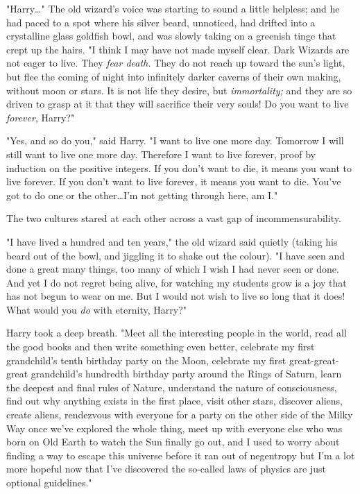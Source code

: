"Harry…" The old wizard’s voice was starting to sound a little helpless;
and he had paced to a spot where his silver beard, unnoticed, had drifted into
a crystalline glass goldfish bowl, and was slowly taking on a greenish tinge
that crept up the hairs. "I think I may have not made myself clear. Dark
Wizards are not eager to live. They \emph{fear death.} They do not reach up
toward the sun’s light, but flee the coming of night into infinitely darker
caverns of their own making, without moon or stars. It is not life they desire,
but \emph{immortality;} and they are so driven to grasp at it that they will
sacrifice their very souls! Do you want to live \emph{forever}, Harry?"

"Yes, and so do you," said Harry. "I want to live one more day. Tomorrow I will
still want to live one more day. Therefore I want to live forever, proof by
induction on the positive integers. If you don’t want to die, it means you want
to live forever. If you don’t want to live forever, it means you want to die.
You’ve got to do one or the other…I’m not getting through here, am I."

The two cultures stared at each other across a vast gap of incommensurability.

"I have lived a hundred and ten years," the old wizard said quietly (taking his
beard out of the bowl, and jiggling it to shake out the colour). "I have seen
and done a great many things, too many of which I wish I had never seen or
done. And yet I do not regret being alive, for watching my students grow is a
joy that has not begun to wear on me. But I would not wish to live so long that
it does! What would you \emph{do} with eternity, Harry?"

Harry took a deep breath. "Meet all the interesting people in the world, read
all the good books and then write something even better, celebrate my first
grandchild’s tenth birthday party on the Moon, celebrate my first
great-great-great grandchild’s hundredth birthday party around the Rings of
Saturn, learn the deepest and final rules of Nature, understand the nature of
consciousness, find out why anything exists in the first place, visit other
stars, discover aliens, create aliens, rendezvous with everyone for a party on
the other side of the Milky Way once we’ve explored the whole thing, meet up
with everyone else who was born on Old Earth to watch the Sun finally go out,
and I used to worry about finding a way to escape this universe before it ran
out of negentropy but I’m a lot more hopeful now that I’ve discovered the
so-called laws of physics are just optional guidelines."

